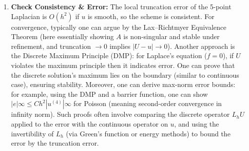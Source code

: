 \documentclass[a4paper,11pt]{report}
\begin{document}
\begin{enumerate}
    \item \textbf{Check Consistency \& Error:} The local truncation error of the 5-point Laplacian is $O(h^2)$ if $u$ is smooth, so the scheme is consistent. For convergence, typically one can argue by the Lax--Richtmyer Equivalence Theorem (here essentially showing $A$ is non-singular and stable under refinement, and truncation $\to0$ implies $|U - u| \to 0$).
          Another approach is the Discrete Maximum Principle (DMP): for Laplace’s equation ($f=0$), if $U$ violates the maximum principle then it indicates error. One can prove that the discrete solution’s maximum lies on the boundary (similar to continuous case), ensuring stability. Moreover, one can derive max-norm error bounds: for example, using the DMP and a barrier function, one can show $|e|\infty \le C h^2 |u^{(4)}|\infty$ for Poisson (meaning second-order convergence in infinity norm). Such proofs often involve comparing the discrete operator $L_h U$ applied to the error with the continuous operator on $u$, and using the invertibility of $L_h$ (via Green’s function or energy methods) to bound the error by the truncation error.
\end{enumerate}
\end{document}
